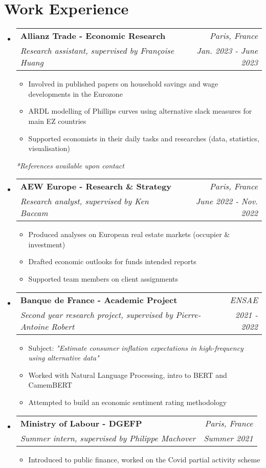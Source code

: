 \documentclass[letterpaper,10pt]{article}
\makeatletter
\newcommand{\resumeItem}[1]{
    \item\small{
            {#1 \vspace{-2pt}}
    }
}
\newcommand{\resumeSubheading}[4]{
    \vspace{-2pt}\item
    \begin{tabular*}{0.97\textwidth}[t]{l@{\extracolsep{\fill}}r}
        \textbf{#1}       & #2                 \\
        \textit{\small#3} & \textit{\small #4} \\
    \end{tabular*}\vspace{-7pt}
}
\newcommand{\resumeSubHeadingListStart}{\begin{itemize}[leftmargin=0.15in, label={}]}
\newcommand{\resumeSubHeadingListEnd}{\end{itemize}}
\newcommand{\resumeItemListStart}{\begin{itemize}}
\newcommand{\resumeItemListEnd}{\end{itemize}\vspace{-5pt}}
\makeatother
\begin{document}
\section{Work Experience}
\resumeSubHeadingListStart
\resumeSubheading
{Allianz Trade - Economic Research}{\textit{\small{Paris, France}}}
{Research assistant, supervised by Françoise Huang}{Jan. 2023 - June 2023}
\resumeItemListStart
\resumeItem{Involved in published papers on household savings and wage developments in the Eurozone}
\resumeItem{ARDL modelling of Phillips curves using alternative slack measures for main EZ countries}
\resumeItem{Supported economists in their daily tasks and researches (data, statistics, visualisation)}
\resumeItemListEnd
\quad \textit{*References available upon contact}
\vspace{.1cm}

\resumeSubheading
{AEW Europe - Research \& Strategy}{\textit{\small{Paris, France}}}
{Research analyst, supervised by Ken Baccam}{June 2022 - Nov. 2022}
\resumeItemListStart
\resumeItem{Produced analyses on European real estate markets (occupier \& investment)}
\resumeItem{Drafted economic outlooks for funds intended reports}
\resumeItem{Supported team members on client assignments}
\resumeItemListEnd
\vspace{.1cm}

\resumeSubheading
{Banque de France - Academic Project}{\textit{\small{ENSAE}}}
{Second year research project, supervised by Pierre-Antoine Robert}{2021 - 2022}
\resumeItemListStart
\resumeItem{Subject: \textit{"Estimate consumer inflation expectations in high-frequency using alternative data"}}
\resumeItem{Worked with Natural Language Processing, intro to BERT and CamemBERT}
\resumeItem{Attempted to build an economic sentiment rating methodology}
\resumeItemListEnd
\vspace{.1cm}

\resumeSubheading
{Ministry of Labour - DGEFP}{\textit{\small{Paris, France}}}
{Summer intern, supervised by Philippe Machover}{Summer 2021}
\resumeItemListStart
\resumeItem{Introduced to public finance, worked on the Covid partial activity scheme}
\resumeItemListEnd
\resumeSubHeadingListEnd

\end{document}

